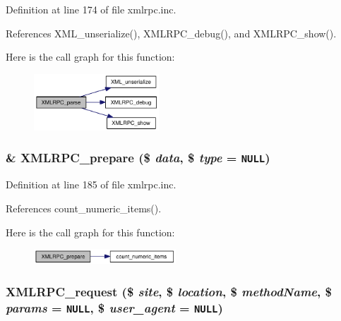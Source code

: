 Definition at line 174 of file xmlrpc.inc.

References XML\_\-unserialize(), XMLRPC\_\-debug(), and XMLRPC\_\-show().

Here is the call graph for this function:\nopagebreak
\begin{figure}[H]
\begin{center}
\leavevmode
\includegraphics[width=133pt]{xmlrpc_8inc_708b2136ca600664d2207a511b3cf3f8_cgraph}
\end{center}
\end{figure}
\hypertarget{xmlrpc_8inc_c13be54b26e0803d8745e4f019dcfd8a}{
\subsubsection{\setlength{\rightskip}{0pt plus 5cm}\& XMLRPC\_\-prepare (\$ {\em data}, \$ {\em type} = {\tt NULL})}}
\label{xmlrpc_8inc_c13be54b26e0803d8745e4f019dcfd8a}




Definition at line 185 of file xmlrpc.inc.

References count\_\-numeric\_\-items().

Here is the call graph for this function:\nopagebreak
\begin{figure}[H]
\begin{center}
\leavevmode
\includegraphics[width=151pt]{xmlrpc_8inc_c13be54b26e0803d8745e4f019dcfd8a_cgraph}
\end{center}
\end{figure}
\hypertarget{xmlrpc_8inc_3a98b6984b8ca01752d1aa9a267526a3}{
\subsubsection{\setlength{\rightskip}{0pt plus 5cm}XMLRPC\_\-request (\$ {\em site}, \$ {\em location}, \$ {\em methodName}, \$ {\em params} = {\tt NULL}, \$ {\em user\_\-agent} = {\tt NULL})}}
\label{xmlrpc_8inc_3a98b6984b8ca01752d1aa9a267526a3}





